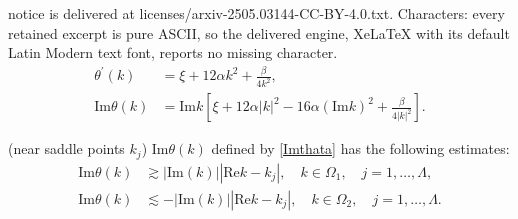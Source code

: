 \documentclass[10pt,a4paper]{amsart}
\begin{document}
notice is delivered at licenses/arxiv-2505.03144-CC-BY-4.0.txt. Characters: every retained excerpt is pure ASCII, so the delivered engine, XeLaTeX with its default Latin Modern text font, reports no missing character.
\begin{align}
    \theta^{'}(k)&=\xi+12\alpha k^2+\frac{\beta}{4k^2},\nonumber\\ \mathrm{Im}\theta(k)&=\mathrm{Im}k\left[\xi+12\alpha|k|^2-16\alpha (\mathrm{Im}k)^2+\frac{\beta}{4|k|^2} \right].\label{Imthata}
\end{align}

\begin{lemma}\label{p10}\textup{(}near saddle points $k_j$\textup{)}
     $\mathrm{Im}\theta(k)$ defined by \eqref{Imthata} has the following estimates:
    \begin{align*}
        \mathrm{Im}\theta(k)&\gtrsim |\mathrm{Im}(k)|\left|\mathrm{Re}k-k_j\right|,\quad k\in\Omega_1,\quad j=1,\dots,\Lambda,\\
\mathrm{Im}\theta(k)&\lesssim -|\mathrm{Im}(k)|\left|\mathrm{Re}k-k_j\right|,\quad k\in\Omega_2,\quad j=1,\dots,\Lambda.
    \end{align*}
\end{lemma}
\end{document}
